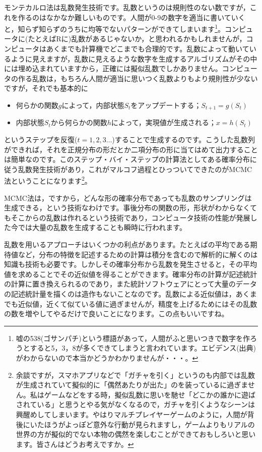 \documentclass{ltjsbook}
\begin{document}
モンテカルロ法は乱数発生技術です。乱数というのは規則性のない数ですが，これを作るのはなかなか難しいものです。人間が0-9の数字を適当に書いていくと，知らず知らずのうちに均等でないパターンができてしまいます\footnote{嘘の538(ゴサンパチ)という標語があって，人間がふと思いつきで数字を作ろうとすると5，3，8が多くできてしまうと言われています。エビデンス(出典)がわからないので本当かどうかわかりませんが・・・。}。コンピュータに(たとえばRに)乱数があるじゃないか，と思われるかもしれませんが，コンピュータはあくまでも計算機でどこまでも合理的です。乱数によって動いているように見えますが，乱数に見えるような数字を生成するアルゴリズムがその中には埋め込まれていますから，正確には擬似乱数でしかありません。コンピュータの作る乱数は，もちろん人間が適当に思いつく乱数よりもより規則性が少ないですが，それでも基本的に
\begin{itemize}
  \item 何らかの関数$g$によって，内部状態$S_t$をアップデートする；$S_{t+1}=g(S_t)$
  \item 内部状態$S_t$から何らかの関数$h$によって，実現値が生成される；$x = h(S_t)$
\end{itemize}
というステップを反復($t=1,2,3\ldots$)することで生成するのです。こうした乱数列ができれば，それを正規分布の形だとか二項分布の形に当てはめて出力することは簡単なのです。このステップ・バイ・ステップの計算法としてある確率分布に従う乱数発生技術があり，これがマルコフ過程とひっついてできたのがMCMC法ということになります\footnote{余談ですが，スマホアプリなどで「ガチャを引く」というのも内部では乱数が生成されていて擬似的に「偶然あたりが出た」のを装っているに過ぎません。私はゲームなどをする時，擬似乱数に思いを馳せ「どこかの誰かに遊ばされている」と思うとやる気がなくなるので，ガチャを引くようなシーンは興醒めしてしまいます。やはりマルチプレイヤーゲームのように，人間が背後にいたほうがよっぽど意外な行動が見られますし，ゲームよりもリアルの世界の方が擬似的でない本物の偶然を楽しむことができておもしろいと思います。皆さんはどうお考えですか。}。

MCMC法は，ですから，どんな形の確率分布であっても乱数のサンプリングは生成できる，という技術なわけです。事後分布の関数の形，形状がわからなくてもそこからの乱数は作れるという技術であり，コンピュータ技術の性能が発展した今では大量の乱数を生成することも瞬時に行われます。

乱数を用いるアプローチはいくつかの利点があります。たとえばの平均である期待値など，分布の特徴を記述するための計算は積分を含むので解析的に解くのは知識も技術も必要です。しかしその確率分布から乱数を発生させると，その平均値を求めることでその近似値を得ることができます。確率分布の計算が記述統計の計算に置き換えられるのであり，また統計ソフトウェアにとって大量のデータの記述統計量を描くのは造作もないことなのです。乱数による近似値は，あくまでも近似値，近くて似ている値に過ぎませんが，精度を上げるためにはその乱数の数を増やしてやるだけで良いことになります。この点もいいですね。
\end{document}
